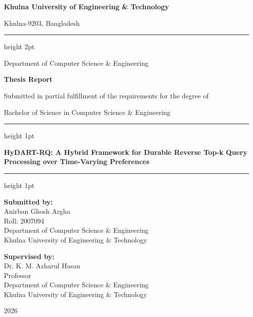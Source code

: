 \documentclass[
  12pt,
  english,
  oneside,
]{report}
\newcommand{\thesistitle}{HyDART-RQ: A Hybrid Framework for Durable Reverse Top-k Query Processing over Time-Varying Preferences}
\newcommand{\authorname}{Anirban Ghosh Argha}
\newcommand{\rollnumber}{2007094}
\newcommand{\supname}{Dr. K. M. Azharul Hasan}
\newcommand{\supdesig}{Professor}
\newcommand{\deptname}{Department of Computer Science \& Engineering}
\newcommand{\univname}{Khulna University of Engineering \& Technology}
\newcommand{\degreename}{Bachelor of Science in Computer Science \& Engineering}
\newcommand{\gradyear}{2026}
\begin{document}
\begin{titlepage}
  \begin{center}
    \vspace*{1cm}
    {\LARGE \bfseries \univname \par}
    \vspace{0.3cm}
    {\large Khulna-9203, Bangladesh \par}
    \vspace{0.5cm}
    \hrule height 2pt
    \vspace{0.3cm}
    {\large \deptname \par}
    \vspace{0.8cm}
    {\large \bfseries Thesis Report \par}
    {\normalsize Submitted in partial fulfillment of the requirements for the degree of \par}
    {\large \degreename \par}
    \vspace{1cm}
    \hrule height 1pt
    \vspace{0.5cm}
    {\Large \bfseries \thesistitle \par}
    \vspace{0.5cm}
    \hrule height 1pt
    \vspace{1cm}

    \begin{minipage}[t]{0.48\textwidth}
      \begin{flushleft}
        \textbf{Submitted by:}\\[4pt]
        \authorname \\
        Roll: \rollnumber \\
        \deptname \\
        \univname
      \end{flushleft}
    \end{minipage}
    \hfill
    \begin{minipage}[t]{0.48\textwidth}
      \begin{flushright}
        \textbf{Supervised by:}\\[4pt]
        \supname \\
        \supdesig \\
        \deptname \\
        \univname
      \end{flushright}
    \end{minipage}

    \vfill
    {\large \gradyear \par}
  \end{center}
\end{titlepage}
\end{document}

